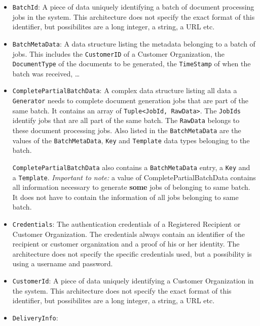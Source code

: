 \documentclass[a4paper,10pt]{article}
\begin{document}
\begin{itemize}
	\item \texttt{BatchId}: A piece of data uniquely identifying a batch of document processing jobs in the system. This architecture does not specify the exact format of this identifier, but possibilites are a long integer, a string, a URL etc.
	
	\item \texttt{BatchMetaData}: A data structure listing the metadata belonging to a batch of jobs. This includes the \texttt{CustomerID} of a Customer Organization, the \texttt{DocumentType} of the documents to be generated, the \texttt{TimeStamp} of when the batch was received, \dots
	
	\item \texttt{CompletePartialBatchData}: A complex data structure listing all data a \texttt{Generator} needs to complete document generation jobs that are part of the same batch. It contains an array of \texttt{Tuple<JobId, RawData>}. The \texttt{JobIds} identify jobs that are all part of the same batch. The \texttt{RawData} belongs to these document processing jobs. Also listed in the \texttt{BatchMetaData} are the values of the \texttt{BatchMetaData}, \texttt{Key} and \texttt{Template} data types belonging to the batch.	
	
	 \texttt{CompletePartialBatchData} also contains a \texttt{BatchMetaData} entry, a \texttt{Key} and a \texttt{Template}. \emph{Important to note:} a value of CompletePartialBatchData contains all information necessary to generate \textbf{some} jobs of belonging to same batch. It does not have to contain the information of all jobs belonging to same batch.

	\item \texttt{Credentials}: The authentication credentials of a Registered Recipient or Customer Organization. The credentials always contain an identifier of the recipient or customer organization and a proof of his or her identity. The architecture does not specify the specific credentials used, but a possibility is using a username and password.
	 
	\item \texttt{CustomerId}: A piece of data uniquely identifying a Customer Organization in the system. This architecture does not specify the exact format of this identifier, but possibilites are a long integer, a string, a URL etc.
	
	\item \texttt{DeliveryInfo}:
	

\end{itemize}
\end{document}
